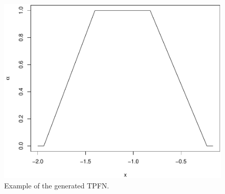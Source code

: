 \begin{figure}[htb]
  \centering
	\includegraphics[scale=0.45]{fuzzy_number_rys1.pdf}
	\caption{Example of the generated TPFN.}
	\label{figFN1}
\end{figure}
